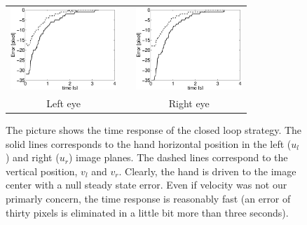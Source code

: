 \begin{figure}
  \begin{center}
	\begin{tabular}{ccc}
	  \parbox{40mm}{\includegraphics[width=40mm]{Figure/TimeReponseLeftClosedLoop.eps}}  & \hspace{2cm} &
	  \parbox{40mm}{\includegraphics[width=40mm]{Figure/TimeReponseRightClosedLoop.eps}}
	  \\
	  Left eye & \hspace{2cm} & Right eye
  \end{tabular}
\end{center}
\caption{The picture shows the time response of the closed loop strategy. The solid lines corresponds to the hand horizontal position in the left ($u_l$) and right ($u_r$) image planes. The dashed lines correspond to the vertical position, $v_l$ and $v_r$. Clearly, the hand is driven to the image center with a null steady state error. Even if velocity was not our primarly concern, the time response is reasonably fast (an error of thirty pixels is eliminated in a little bit more than three seconds). }\label{Fig:TimeResponseClosedLoopErrors}
  \end{figure}
